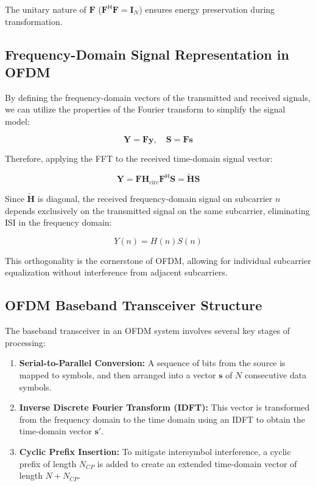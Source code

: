 The unitary nature of \(\mathbf{F}\) (\(\mathbf{F}^\mathsf{H}\mathbf{F} = \mathbf{I}_N\)) ensures energy preservation during transformation.

\subsection*{Frequency-Domain Signal Representation in OFDM}

By defining the frequency-domain vectors of the transmitted and received signals, we can utilize the properties of the Fourier transform to simplify the signal model:

\begin{equation}
    \mathbf{Y} = \mathbf{F} \mathbf{y}, \quad \mathbf{S} = \mathbf{F} \mathbf{s}
\end{equation}

Therefore, applying the FFT to the received time-domain signal vector:

\begin{equation}
    \mathbf{Y} = \mathbf{F} \mathbf{H}_{\text{circ}} \mathbf{F}^\mathsf{H} \mathbf{S} = \mathbf{\tilde{H}} \mathbf{S}
\end{equation}

Since \(\mathbf{\tilde{H}}\) is diagonal, the received frequency-domain signal on subcarrier \(n\) depends exclusively on the transmitted signal on the same subcarrier, eliminating ISI in the frequency domain:

\begin{equation}
    Y(n) = H(n) S(n)
\end{equation}

This orthogonality is the cornerstone of OFDM, allowing for individual subcarrier equalization without interference from adjacent subcarriers.


\subsection*{OFDM Baseband Transceiver Structure}

The baseband transceiver in an OFDM system involves several key stages of processing:

\begin{enumerate}
    \item \textbf{Serial-to-Parallel Conversion:} A sequence of bits from the source is mapped to symbols, and then arranged into a vector \(\mathbf{s}\) of \(N\) consecutive data symbols.
    \item \textbf{Inverse Discrete Fourier Transform (IDFT):} This vector is transformed from the frequency domain to the time domain using an IDFT to obtain the time-domain vector \(\mathbf{s}'\).
    \item \textbf{Cyclic Prefix Insertion:} To mitigate intersymbol interference, a cyclic prefix of length \(N_{CP}\) is added to create an extended time-domain vector of length \(N + N_{CP}\).
\end{enumerate}

